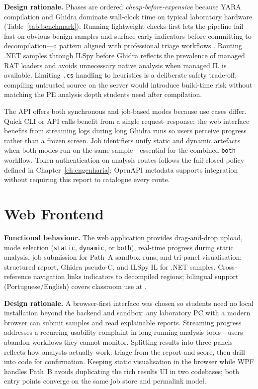 \textbf{Design rationale.}
Phases are ordered \emph{cheap-before-expensive} because YARA compilation and Ghidra dominate
wall-clock time on typical laboratory hardware (Table~\ref{tab:benchmark}). Running lightweight
checks first lets the pipeline fail fast on obvious benign samples and surface early indicators
before committing to decompilation---a pattern aligned with professional triage workflows
\cite{bensaoud2024,anderson2012}. Routing .NET samples through ILSpy before Ghidra reflects the
prevalence of managed RAT loaders and avoids unnecessary native analysis when managed IL is
available. Limiting \texttt{.cs} handling to heuristics is a deliberate safety trade-off: compiling
untrusted source on the server would introduce build-time risk without matching the PE analysis
depth students need after compilation.

The API offers both synchronous and job-based modes because use cases differ. Quick CLI or API
calls benefit from a single request--response; the web interface benefits from streaming logs
during long Ghidra runs so users perceive progress rather than a frozen screen. Job identifiers
unify static and dynamic artefacts when both modes run on the same sample---essential for the
combined \texttt{both} workflow. Token authentication on analysis routes follows the fail-closed
policy defined in Chapter~\ref{ch:engenharia}; OpenAPI metadata supports integration without
requiring this report to catalogue every route.

\section{Web Frontend}

\textbf{Functional behaviour.}
The web application provides drag-and-drop upload, mode selection (\texttt{static},
\texttt{dynamic}, or \texttt{both}), real-time progress during static analysis, job submission for
Path~A sandbox runs, and tri-panel visualisation: structured report, Ghidra pseudo-C, and ILSpy IL
for .NET samples. Cross-reference navigation links indicators to decompiled regions; bilingual
support (Portuguese/English) covers classroom use at \ubi{}.

\textbf{Design rationale.}
A browser-first interface was chosen so students need no local installation beyond the backend and
sandbox: any laboratory PC with a modern browser can submit samples and read explainable reports.
Streaming progress addresses a recurring usability complaint in long-running analysis tools---users
abandon workflows they cannot monitor. Splitting results into three panels reflects how analysts
actually work: triage from the report and score, then drill into code for confirmation. Keeping
static visualisation in the browser while WPF handles Path~B avoids duplicating the rich results UI
in two codebases; both entry points converge on the same job store and permalink model.

